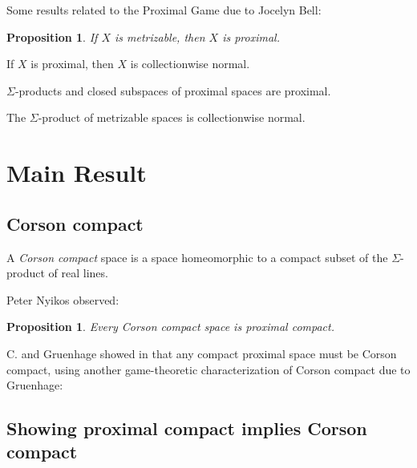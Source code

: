 \documentclass{beamer}
\newtheorem{proposition}[theorem]{Proposition}
\theoremstyle{definition}
\newcommand{\<}{\langle}
\renewcommand{\>}{\rangle}
\newcommand{\term}{\textit}
\begin{document}
\begin{frame}
  Some results related to the Proximal Game due to Jocelyn Bell:

  \begin{proposition}
    If $X$ is metrizable, then $X$ is proximal.
  \end{proposition}

  \begin{theorem}
    If $X$ is proximal, then $X$ is collectionwise normal.
  \end{theorem}

  \begin{theorem}
    $\Sigma$-products and closed subspaces of proximal spaces are proximal.
  \end{theorem}

  \pause

  \begin{corollary}
    The $\Sigma$-product of metrizable spaces is collectionwise normal.
    \cite{MR0461410} \cite{MR716576}
  \end{corollary}
\end{frame}

\section{Main Result}

\subsection{Corson compact}

\begin{frame}
  A \term{Corson compact} space is a space homeomorphic to a compact
  subset of the $\Sigma$-product of real lines.

  \vpause

  Peter Nyikos observed:

  \begin{proposition}
    Every Corson compact space is proximal compact. \cite{nyikosProximalPreprint}
  \end{proposition}

  \pause

  C. and Gruenhage showed in \cite{MR3227201} that any compact proximal
  space must be Corson compact, using another game-theoretic characterization
  of Corson compact due to Gruenhage:
\end{frame}

\subsection{Showing proximal compact implies Corson compact}
\end{document}

